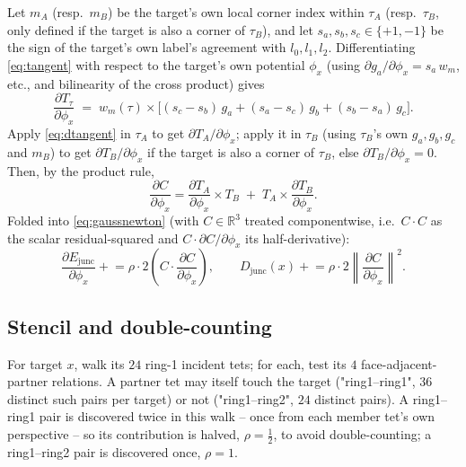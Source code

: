 \documentclass[11pt]{article}
\newcommand{\R}{\mathbb{R}}
\begin{document}
Let $m_A$ (resp.\ $m_B$) be the target's own local corner index within
$\tau_A$ (resp.\ $\tau_B$, only defined if the target is also a corner of
$\tau_B$), and let $s_a,s_b,s_c\in\{+1,-1\}$ be the sign of the target's
own label's agreement with $l_0,l_1,l_2$. Differentiating
\eqref{eq:tangent} with respect to the target's own potential $\phi_x$
(using $\partial g_a/\partial\phi_x = s_a\,w_{m}$, etc., and bilinearity of
the cross product) gives
\begin{equation}
  \frac{\partial T_\tau}{\partial\phi_x} \;=\; w_{m}(\tau) \times
  \Big[(s_c{-}s_b)\,g_a + (s_a{-}s_c)\,g_b + (s_b{-}s_a)\,g_c\Big].
  \label{eq:dtangent}
\end{equation}
Apply \eqref{eq:dtangent} in $\tau_A$ to get $\partial T_A/\partial\phi_x$;
apply it in $\tau_B$ (using $\tau_B$'s own $g_a,g_b,g_c$ and $m_B$) to get
$\partial T_B/\partial\phi_x$ if the target is also a corner of $\tau_B$,
else $\partial T_B/\partial\phi_x = 0$. Then, by the product rule,
\begin{equation}
  \frac{\partial C}{\partial\phi_x} = \frac{\partial T_A}{\partial\phi_x}
  \times T_B \;+\; T_A \times \frac{\partial T_B}{\partial\phi_x}.
\end{equation}
Folded into \eqref{eq:gaussnewton} (with $C\in\R^3$ treated
componentwise, i.e.\ $C\cdot C$ as the scalar residual-squared and
$C\cdot\partial C/\partial\phi_x$ its half-derivative):
\begin{equation}
  \frac{\partial E_{\text{junc}}}{\partial\phi_x} \mathrel{+}= \rho\cdot
  2\left(C\cdot\frac{\partial C}{\partial\phi_x}\right), \qquad
  D_{\text{junc}}(x) \mathrel{+}= \rho\cdot 2\left\lVert
  \frac{\partial C}{\partial\phi_x}\right\rVert^2 .
\end{equation}

\subsection{Stencil and double-counting}

For target $x$, walk its $24$ ring-1 incident tets; for each, test its $4$
face-adjacent-partner relations. A partner tet may itself touch the
target ("ring1--ring1", $36$ distinct such pairs per target) or not
("ring1--ring2", $24$ distinct pairs). A ring1--ring1 pair is discovered
twice in this walk -- once from each member tet's own perspective -- so
its contribution is halved, $\rho = \tfrac12$, to avoid double-counting;
a ring1--ring2 pair is discovered once, $\rho = 1$.
\end{document}
